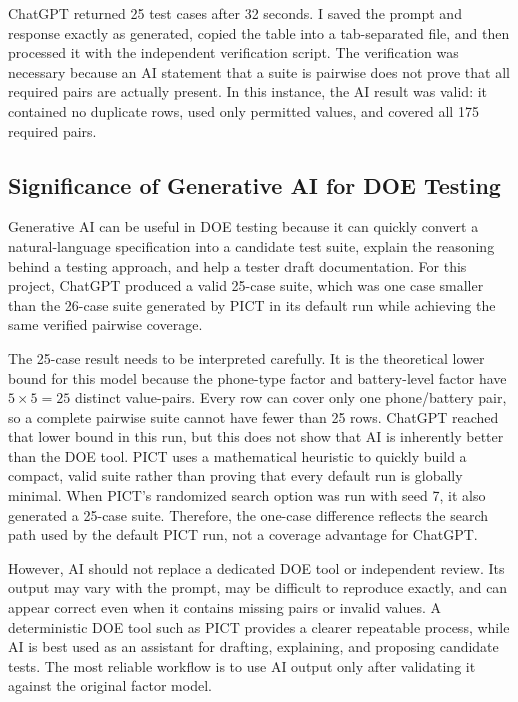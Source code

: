 \documentclass[11pt]{article}
\begin{document}
ChatGPT returned 25 test cases after 32 seconds. I saved the prompt and response exactly as generated, copied the table into a tab-separated file, and then processed it with the independent verification script. The verification was necessary because an AI statement that a suite is pairwise does not prove that all required pairs are actually present. In this instance, the AI result was valid: it contained no duplicate rows, used only permitted values, and covered all 175 required pairs.

\subsection{Significance of Generative AI for DOE Testing}

Generative AI can be useful in DOE testing because it can quickly convert a natural-language specification into a candidate test suite, explain the reasoning behind a testing approach, and help a tester draft documentation. For this project, ChatGPT produced a valid 25-case suite, which was one case smaller than the 26-case suite generated by PICT in its default run while achieving the same verified pairwise coverage.

The 25-case result needs to be interpreted carefully. It is the theoretical lower bound for this model because the phone-type factor and battery-level factor have $5 \times 5 = 25$ distinct value-pairs. Every row can cover only one phone/battery pair, so a complete pairwise suite cannot have fewer than 25 rows. ChatGPT reached that lower bound in this run, but this does not show that AI is inherently better than the DOE tool. PICT uses a mathematical heuristic to quickly build a compact, valid suite rather than proving that every default run is globally minimal. When PICT's randomized search option was run with seed 7, it also generated a 25-case suite. Therefore, the one-case difference reflects the search path used by the default PICT run, not a coverage advantage for ChatGPT.

However, AI should not replace a dedicated DOE tool or independent review. Its output may vary with the prompt, may be difficult to reproduce exactly, and can appear correct even when it contains missing pairs or invalid values. A deterministic DOE tool such as PICT provides a clearer repeatable process, while AI is best used as an assistant for drafting, explaining, and proposing candidate tests. The most reliable workflow is to use AI output only after validating it against the original factor model.
\end{document}
